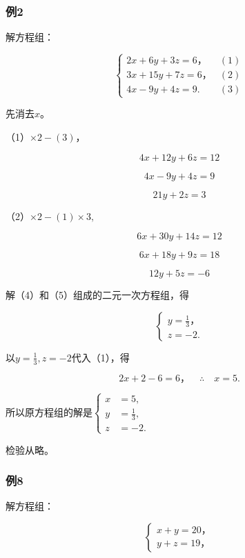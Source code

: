 \subsubsection{例2}

解方程组：

\[
\left\{ \begin{array}{ll} 2 x + 6 y + 3 z = 6\text{，} & (1) \\ 3 x + 15 y + 7 z = 6\text{，} & (2) \\ 4 x - 9 y + 4 z = 9. & (3) \end{array} \right.
\]

 先消去\(x\)。

（1）\(\times 2 - (3)\)，

\[
4 x + 12 y + 6 z = 12
\]

\[
4 x - 9 y + 4 z = 9
\]

\[
21 y + 2 z = 3
\]

（2）\(\times 2 - (1) \times 3,\)

\[
6 x + 30 y + 14 z = 12
\]

\[
6 x + 18 y + 9 z = 18
\]

\[
12 y + 5 z = - 6
\]

解（4）和（5）组成的二元一次方程组，得

\[
\left\{ \begin{array}{l} y = \frac{1}{3}\text{，} \\ z = - 2. \end{array} \right.
\]

以\(y = \frac{1}{3}, z = -2\)代入（1），得

\[
2 x + 2 - 6 = 6\text{，} \quad \therefore \quad x = 5.
\]

所以原方程组的解是\(\left\{\begin{aligned}x&=5,\\ y&=\frac{1}{3},\\ z&=-2.\end{aligned}\right.\)

检验从略。

\subsubsection{例8}

解方程组：

\[
\left\{ \begin{array}{l} x + y = 20\text{，} \\ y + z = 19\text{，} \end{array} \right. \tag{1}
\]


